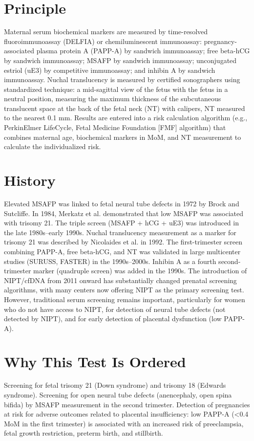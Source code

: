 \section*{Principle}
Maternal serum biochemical markers are measured by time-resolved fluoroimmunoassay (DELFIA) or chemiluminescent immunoassay: pregnancy-associated plasma protein A (PAPP-A) by sandwich immunoassay; free beta-hCG by sandwich immunoassay; MSAFP by sandwich immunoassay; unconjugated estriol (uE3) by competitive immunoassay; and inhibin A by sandwich immunoassay. Nuchal translucency is measured by certified sonographers using standardized technique: a mid-sagittal view of the fetus with the fetus in a neutral position, measuring the maximum thickness of the subcutaneous translucent space at the back of the fetal neck (NT) with calipers, NT measured to the nearest 0.1 mm. Results are entered into a risk calculation algorithm (e.g., PerkinElmer LifeCycle, Fetal Medicine Foundation [FMF] algorithm) that combines maternal age, biochemical markers in MoM, and NT measurement to calculate the individualized risk.

\section*{History}
Elevated MSAFP was linked to fetal neural tube defects in 1972 by Brock and Sutcliffe. In 1984, Merkatz et al. demonstrated that low MSAFP was associated with trisomy 21. The triple screen (MSAFP + hCG + uE3) was introduced in the late 1980s--early 1990s. Nuchal translucency measurement as a marker for trisomy 21 was described by Nicolaides et al. in 1992. The first-trimester screen combining PAPP-A, free beta-hCG, and NT was validated in large multicenter studies (SURUSS, FASTER) in the 1990s--2000s. Inhibin A as a fourth second-trimester marker (quadruple screen) was added in the 1990s. The introduction of NIPT/cfDNA from 2011 onward has substantially changed prenatal screening algorithms, with many centers now offering NIPT as the primary screening test. However, traditional serum screening remains important, particularly for women who do not have access to NIPT, for detection of neural tube defects (not detected by NIPT), and for early detection of placental dysfunction (low PAPP-A).

\section*{Why This Test Is Ordered}
Screening for fetal trisomy 21 (Down syndrome) and trisomy 18 (Edwards syndrome). Screening for open neural tube defects (anencephaly, open spina bifida) by MSAFP measurement in the second trimester. Detection of pregnancies at risk for adverse outcomes related to placental insufficiency: low PAPP-A (<0.4 MoM in the first trimester) is associated with an increased risk of preeclampsia, fetal growth restriction, preterm birth, and stillbirth.


